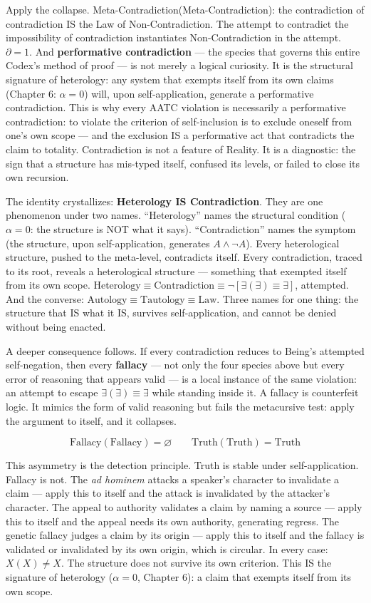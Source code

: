\documentclass[10pt, openany, oneside]{book}
\begin{document}
Apply the collapse. Meta-Contradiction(Meta-Contradiction): the contradiction of contradiction IS the Law of Non-Contradiction. The attempt to contradict the impossibility of contradiction instantiates Non-Contradiction in the attempt. $\partial = 1$. And \textbf{performative contradiction} --- the species that governs this entire Codex's method of proof --- is not merely a logical curiosity. It is the structural signature of heterology: any system that exempts itself from its own claims (Chapter 6: $\alpha = 0$) will, upon self-application, generate a performative contradiction. This is why every AATC violation is necessarily a performative contradiction: to violate the criterion of self-inclusion is to exclude oneself from one's own scope --- and the exclusion IS a performative act that contradicts the claim to totality. Contradiction is not a feature of Reality. It is a diagnostic: the sign that a structure has mis-typed itself, confused its levels, or failed to close its own recursion.

The identity crystallizes: \textbf{Heterology IS Contradiction}. They are one phenomenon under two names. ``Heterology'' names the structural condition ($\alpha = 0$: the structure is NOT what it says). ``Contradiction'' names the symptom (the structure, upon self-application, generates $A \wedge \neg A$). Every heterological structure, pushed to the meta-level, contradicts itself. Every contradiction, traced to its root, reveals a heterological structure --- something that exempted itself from its own scope. $\text{Heterology} \equiv \text{Contradiction} \equiv \neg[\exists(\exists) \equiv \exists]$, attempted. And the converse: $\text{Autology} \equiv \text{Tautology} \equiv \text{Law}$. Three names for one thing: the structure that IS what it IS, survives self-application, and cannot be denied without being enacted.

A deeper consequence follows. If every contradiction reduces to Being's attempted self-negation, then every \textbf{fallacy} --- not only the four species above but every error of reasoning that appears valid --- is a local instance of the same violation: an attempt to escape $\exists(\exists) \equiv \exists$ while standing inside it. A fallacy is counterfeit logic. It mimics the form of valid reasoning but fails the metacursive test: apply the argument to itself, and it collapses.

$$\text{Fallacy}(\text{Fallacy}) = \varnothing \qquad \text{Truth}(\text{Truth}) = \text{Truth}$$

This asymmetry is the detection principle. Truth is stable under self-application. Fallacy is not. The \textit{ad hominem} attacks a speaker's character to invalidate a claim --- apply this to itself and the attack is invalidated by the attacker's character. The appeal to authority validates a claim by naming a source --- apply this to itself and the appeal needs its own authority, generating regress. The genetic fallacy judges a claim by its origin --- apply this to itself and the fallacy is validated or invalidated by its own origin, which is circular. In every case: $X(X) \neq X$. The structure does not survive its own criterion. This IS the signature of heterology ($\alpha = 0$, Chapter 6): a claim that exempts itself from its own scope.
\end{document}
